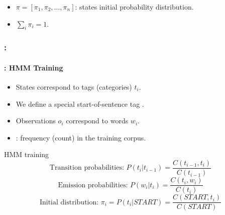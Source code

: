 \documentclass[xcolor=table]{beamer}
\begin{document}
\begin{frame}
\begin{minipage}{.45\textwidth}
		\end{minipage}
	
	\begin{itemize}
			\item $\pi = [\pi_1, \pi_2, \ldots, \pi_n ]$: states initial probability distribution.
			\item $\sum_i \pi_i = 1$.
		\end{itemize}
	
\end{frame}

\begin{frame}
	\frametitle{\insertshortsubtitle: \insertsection}
	\framesubtitle{\insertsubsection: HMM Training}
	
	\begin{itemize}
			\item States correspond to tags (categories) $t_i$.
			\item We define a special start-of-sentence tag .
			\item Observations $o_i$ correspond to words $w_i$.
			\item {}: frequency (count) in the training corpus.
			
		\end{itemize}
	
	\begin{block}{HMM training}
			\[
			\text{Transition probabilities: } P(t_i | t_{i-1}) = \frac{C(t_{i-1}, t_i)}{C(t_{i-1})} 
			\]\[
			\text{Emission probabilities: } P(w_i | t_i) = \frac{C(t_i, w_i)}{C(t_i)}
			\]\[
			\text{Initial distribution: } \pi_i = P(t_i | START) = \frac{C(START, t_i)}{C(START)}
			\]
		\end{block}
\end{frame}
\end{document}
